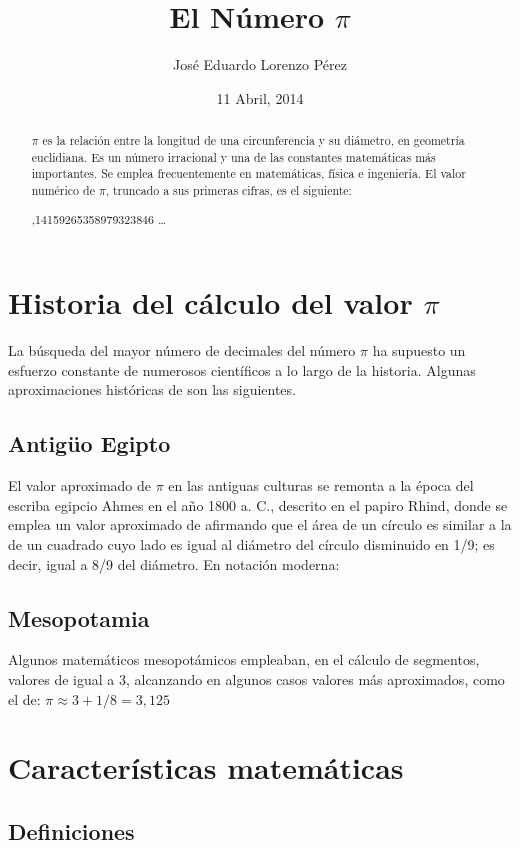 \documentclass[spanish,a4paper,11pt]{article}
\title{El Número $\pi$}
\author{José Eduardo Lorenzo Pérez}
\date{11 Abril, 2014}
\begin{document}
\maketitle

\begin{abstract}
$\pi$ es la relación entre la longitud de una circunferencia y su diámetro, 
en geometría euclidiana. Es un número irracional y una de las constantes matemáticas más importantes. 
Se emplea frecuentemente en matemáticas, física e ingeniería. El valor numérico de $\pi$, truncado a sus primeras cifras, es el siguiente:

\pi {},14159265358979323846 \; \dots 
\end{abstract}

\section{Historia del cálculo del valor $\pi$}
La búsqueda del mayor número de decimales del número $\pi$ ha supuesto un esfuerzo constante
de numerosos científicos a lo largo de la historia. Algunas aproximaciones históricas de \PI son las siguientes.

\subsection{Antigüo Egipto}
El valor aproximado de $\pi$ en las antiguas culturas se remonta a la época del escriba egipcio Ahmes en el año 1800 a. C.,
descrito en el papiro Rhind\cite{Robins}, donde se emplea un valor aproximado de \PI afirmando que el área de un círculo
es similar a la de un cuadrado cuyo lado es igual al diámetro del círculo disminuido en 1/9; es decir, igual a 8/9 del
diámetro. En notación moderna:

\subsection{Mesopotamia}
Algunos matemáticos mesopotámicos empleaban, en el cálculo de segmentos, valores de \PI igual a 3, alcanzando en algunos
casos valores más aproximados, como el de:
$\pi \approx 3+1/8=3,125$


\section{Características matemáticas}

\subsection{Definiciones}
\end{document}
